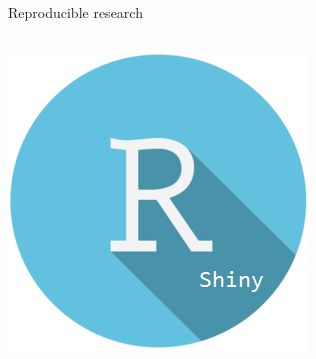 \documentclass[serif]{beamer}\usepackage[]{graphicx}\usepackage[]{color}
\begin{document}
\begin{frame}{Reproducible research}
\begin{columns}
\begin{column}{0.2\textwidth}
\centerline{\includegraphics[width = \textwidth]{fig/shiny_logo.png}}
\end{column}
\end{columns}
\end{frame}
\end{document}
